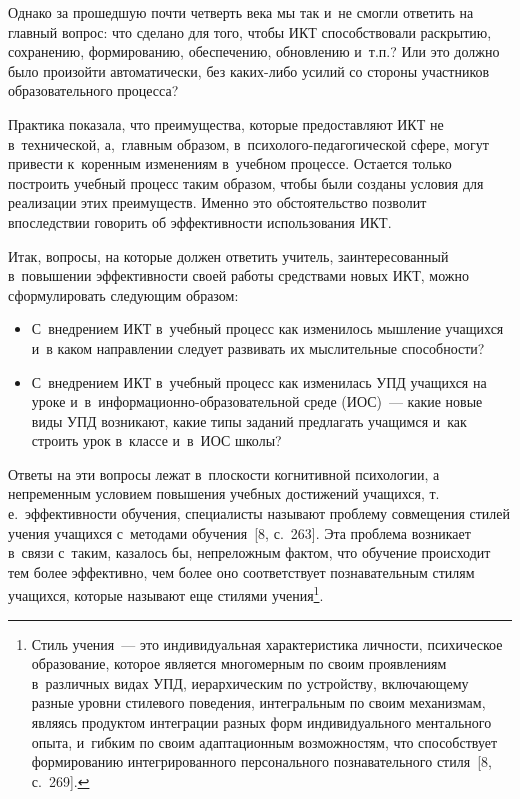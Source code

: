 \begin{multicols}{2}
  Однако за прошедшую почти четверть века мы так и~не смогли ответить на главный вопрос:
что сделано для того, чтобы ИКТ способствовали раскрытию, сохранению, формированию,
обеспечению, обновлению и~т.п.? Или это должно было произойти автоматически, без
  ка\-ких-ли\-бо усилий со стороны участников образовательного процесса?

  Практика показала, что преимущества, которые предоставляют ИКТ не в~технической,
а,~главным образом, в~пси\-хо\-ло\-го-пе\-да\-го\-ги\-че\-ской сфере, могут привести
к~коренным изменениям в~учебном процессе. Остается только построить учебный процесс
таким образом, чтобы были созданы условия для реализации этих преимуществ. Именно это
обстоятельство позволит впоследствии говорить об эффективности использования ИКТ.

  Итак, вопросы, на которые должен ответить учитель, заинтересованный в~повышении
эффективности своей работы средствами новых ИКТ, можно сформулировать следующим
образом:
  \begin{itemize}
\item С~внедрением ИКТ в~учебный процесс как изменилось мышление учащихся и~в каком
направлении следует развивать их мыслительные способности?
\item С~внедрением ИКТ в~учебный процесс как изменилась УПД учащихся на уроке
и~в~ин\-фор\-ма\-ци\-он\-но-обра\-зо\-ва\-тель\-ной среде (ИОС)~--- какие новые виды
УПД возникают, какие типы заданий предлагать учащимся и~как строить урок в~классе
и~в~ИОС школы?
\end{itemize}

   Ответы на эти вопросы лежат в~плоскости когнитивной психологии, а непременным
условием повышения учебных достижений учащихся, т.\,е.\ эффективности обучения,
специалисты называют проблему совмещения стилей учения учащихся с~методами
обучения~[8, с.~263]. Эта проблема возникает в~связи с~таким, казалось бы, непреложным
фактом, что обучение происходит тем более эффективно, чем более оно соответствует
познавательным стилям учащихся, которые называют еще стилями учения\footnote{Стиль
учения~--- это индивидуальная характеристика личности, психическое образование, которое
является многомерным по своим проявлениям в~различных видах УПД, иерархическим по
устройству, включающему разные уровни стилевого поведения, интегральным по своим
механизмам, являясь продуктом интеграции разных форм индивидуального ментального опыта,
и~гибким по своим адаптационным возможностям, что способствует формированию
интегрированного персонального познавательного стиля~[8, с.~269].}.


\end{multicols}
